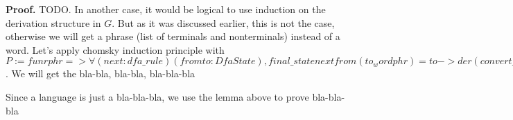 \textbf{Proof.} TODO.
In another case, it would be logical to use induction on the derivation structure in $G$. But as it was discussed earlier, this is not the case, otherwise we will get a phrase (list of terminals and nonterminals) instead of a word. 
Let's apply chomsky induction principle with 
  $P := fun r phr => \forall (next : dfa\_rule) (from to : DfaState),
           final\_state next from (to_word phr) = to ->
            der (convert\_rules G next) (V (from, r, to)) phr$.
We will get the bla-bla, bla-bla, bla-bla-bla         



Since a language is just a bla-bla-bla, we use the lemma above to prove bla-bla-bla














